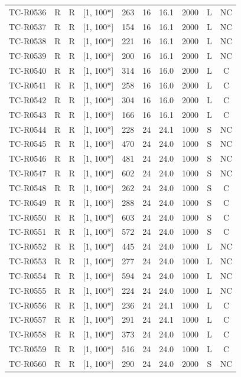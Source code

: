 \begin{longtable}{lccccccccc}
TC-R0536 & R & R & [1, 100*] & 263 & 16 & 16.1 & 2000 & L & NC \\
TC-R0537 & R & R & [1, 100*] & 154 & 16 & 16.1 & 2000 & L & NC \\
TC-R0538 & R & R & [1, 100*] & 221 & 16 & 16.1 & 2000 & L & NC \\
TC-R0539 & R & R & [1, 100*] & 200 & 16 & 16.1 & 2000 & L & NC \\
TC-R0540 & R & R & [1, 100*] & 314 & 16 & 16.0 & 2000 & L & C \\
TC-R0541 & R & R & [1, 100*] & 258 & 16 & 16.0 & 2000 & L & C \\
TC-R0542 & R & R & [1, 100*] & 304 & 16 & 16.0 & 2000 & L & C \\
TC-R0543 & R & R & [1, 100*] & 166 & 16 & 16.1 & 2000 & L & C \\
TC-R0544 & R & R & [1, 100*] & 228 & 24 & 24.1 & 1000 & S & NC \\
TC-R0545 & R & R & [1, 100*] & 470 & 24 & 24.0 & 1000 & S & NC \\
TC-R0546 & R & R & [1, 100*] & 481 & 24 & 24.0 & 1000 & S & NC \\
TC-R0547 & R & R & [1, 100*] & 602 & 24 & 24.0 & 1000 & S & NC \\
TC-R0548 & R & R & [1, 100*] & 262 & 24 & 24.0 & 1000 & S & C \\
TC-R0549 & R & R & [1, 100*] & 288 & 24 & 24.0 & 1000 & S & C \\
TC-R0550 & R & R & [1, 100*] & 603 & 24 & 24.0 & 1000 & S & C \\
TC-R0551 & R & R & [1, 100*] & 572 & 24 & 24.0 & 1000 & S & C \\
TC-R0552 & R & R & [1, 100*] & 445 & 24 & 24.0 & 1000 & L & NC \\
TC-R0553 & R & R & [1, 100*] & 277 & 24 & 24.0 & 1000 & L & NC \\
TC-R0554 & R & R & [1, 100*] & 594 & 24 & 24.0 & 1000 & L & NC \\
TC-R0555 & R & R & [1, 100*] & 224 & 24 & 24.0 & 1000 & L & NC \\
TC-R0556 & R & R & [1, 100*] & 236 & 24 & 24.1 & 1000 & L & C \\
TC-R0557 & R & R & [1, 100*] & 291 & 24 & 24.1 & 1000 & L & C \\
TC-R0558 & R & R & [1, 100*] & 373 & 24 & 24.0 & 1000 & L & C \\
TC-R0559 & R & R & [1, 100*] & 516 & 24 & 24.0 & 1000 & L & C \\
TC-R0560 & R & R & [1, 100*] & 290 & 24 & 24.0 & 2000 & S & NC \\

\end{longtable}

